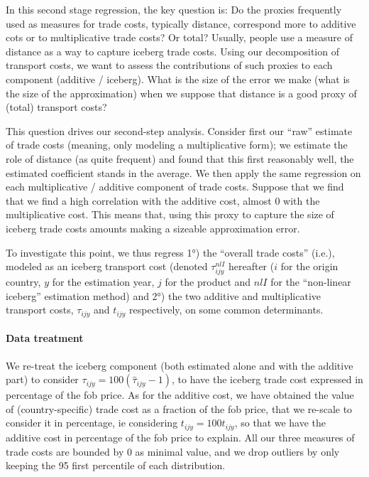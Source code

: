 \documentclass[a4paper,11pt]{article}
\begin{document}
In this second stage regression, the key question is: Do the proxies frequently used as measures for trade costs, typically distance, correspond more to additive cots or to multiplicative trade costs? Or total? Usually, people use a measure of distance as a way to capture iceberg trade costs. Using our decomposition of transport costs, we want to assess the contributions of such proxies to each component (additive / iceberg). What is the size of the error we make (what is the size of the approximation) when we suppose that distance is a good proxy of (total) transport costs?

This question drives our second-step analysis. Consider first our ``raw'' estimate of trade costs (meaning, only modeling a multiplicative form); we estimate the role of distance (as quite frequent) and found that this first reasonably well, the estimated coefficient stands in the average. We then apply the same regression on each multiplicative / additive component of trade costs. Suppose that we find that we find a high correlation with the additive cost, almost 0 with the multiplicative cost. This means that, using this proxy to capture the size of iceberg trade costs amounts making a sizeable approximation error.\bigskip


To investigate this point, we thus regress 1°) the ``overall trade costs'' (i.e.), modeled as an iceberg transport cost (denoted $\tau_{ijy}^{nlI}$ hereafter ($i$ for the origin country, $y$ for the estimation year, $j$ for the product and $nlI$ for the ``non-linear iceberg'' estimation method) and 2°) the two additive and multiplicative transport costs, $\tau_{ijy}$ and $t_{ijy}$ respectively, on some common determinants. \medskip


\paragraph{Data treatment} We re-treat the iceberg component (both estimated alone and with the additive part) to consider $\tau_{ijy} =  100(\widehat{\tau}_{ijy}-1)$, to have the iceberg trade cost expressed in percentage of the fob price. As for the additive cost, we have obtained the value of (country-specific) trade cost as a fraction of the fob price, that we re-scale to consider it in percentage, ie considering $t_{ijy} =  100 t_{ijy}$, so that we have the additive cost in percentage of the fob price to explain. All our three measures of trade costs are bounded by 0 as minimal value, and we drop outliers by only keeping the 95 first percentile of each distribution.\bigskip
\end{document}
